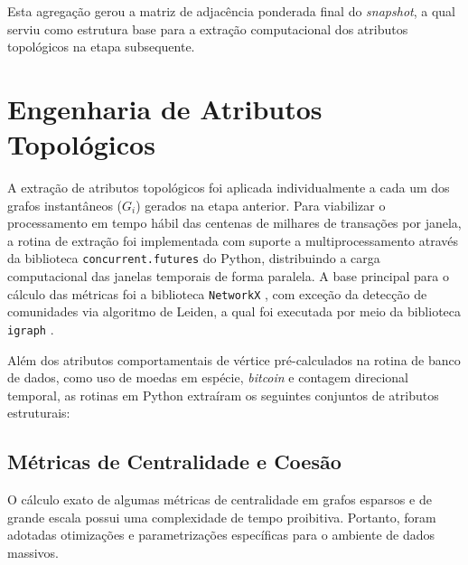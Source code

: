 \documentclass[titlepage,a4paper,oneside,onecolumn,12pt]{report}
\begin{document}
Esta agregação gerou a matriz de adjacência ponderada final do \textit{snapshot}, a qual serviu como estrutura base para a extração computacional dos atributos topológicos na etapa subsequente.

\section{Engenharia de Atributos Topológicos}
\label{sec:topologicos}

A extração de atributos topológicos foi aplicada individualmente a cada um dos grafos instantâneos ($G_i$) gerados na etapa anterior. Para viabilizar o processamento em tempo hábil das centenas de milhares de transações por janela, a rotina de extração foi implementada com suporte a multiprocessamento através da biblioteca \texttt{concurrent.futures} do Python, distribuindo a carga computacional das janelas temporais de forma paralela. A base principal para o cálculo das métricas foi a biblioteca \texttt{NetworkX} \cite{hagberg2008exploring}, com exceção da detecção de comunidades via algoritmo de Leiden, a qual foi executada por meio da biblioteca \texttt{igraph} \cite{traag2019leiden}.

Além dos atributos comportamentais de vértice pré-calculados na rotina de banco de dados, como uso de moedas em espécie, \textit{bitcoin} e contagem direcional temporal, as rotinas em Python extraíram os seguintes conjuntos de atributos estruturais:

\subsection{Métricas de Centralidade e Coesão}
\label{sec:centralidade_metodologia}

O cálculo exato de algumas métricas de centralidade em grafos esparsos e de grande escala possui uma complexidade de tempo proibitiva. Portanto, foram adotadas otimizações e parametrizações específicas para o ambiente de dados massivos.
\end{document}
